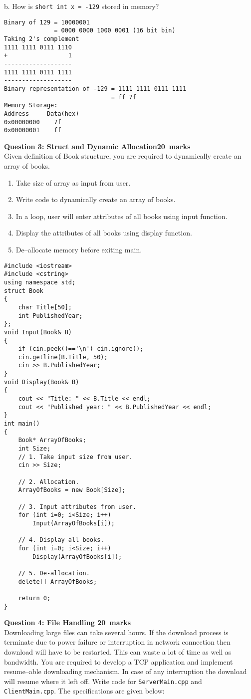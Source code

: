 \documentclass[12pt,a4paper]{article}
\def\Qthree{20}
\def\Qfour{20}
\begin{document}
b. How is \verb|short int x = -129| stored in memory?
\begin{verbatim}
Binary of 129 = 10000001
              = 0000 0000 1000 0001 (16 bit bin)
Taking 2's complement
1111 1111 0111 1110
+                 1
-------------------
1111 1111 0111 1111
-------------------
Binary representation of -129 = 1111 1111 0111 1111
                              = ff 7f
Memory Storage:
Address     Data(hex)
0x00000000    7f
0x00000001    ff
\end{verbatim}
\newpage
\noindent\textbf{Question 3: Struct and Dynamic Allocation\hfill \Qthree~marks}\\
Given definition of Book structure, you are required to dynamically create an array of books.
\begin{enumerate}
\item Take size of array as input from user.
\item Write code to dynamically create an array of books.
\item In a loop, user will enter attributes of all books using input function.
\item Display the attributes of all books using display function.
\item De--allocate memory before exiting main.
\end{enumerate}
\begin{lstlisting}
#include <iostream>
#include <cstring>
using namespace std;
struct Book
{
	char Title[50];
	int PublishedYear;
};
void Input(Book& B)
{
	if (cin.peek()=='\n') cin.ignore();
	cin.getline(B.Title, 50);
	cin >> B.PublishedYear;
}
void Display(Book& B)
{
	cout << "Title: " << B.Title << endl;
	cout << "Published year: " << B.PublishedYear << endl;
}
int main()
{
	Book* ArrayOfBooks;
	int Size;
	// 1. Take input size from user.
	cin >> Size;

	// 2. Allocation.
	ArrayOfBooks = new Book[Size];

	// 3. Input attributes from user.
	for (int i=0; i<Size; i++)
		Input(ArrayOfBooks[i]);

	// 4. Display all books.
	for (int i=0; i<Size; i++)
		Display(ArrayOfBooks[i]);

	// 5. De-allocation.
	delete[] ArrayOfBooks;

	return 0;
}
\end{lstlisting}
\newpage
\noindent\textbf{Question 4: File Handling \hfill \Qfour~marks}\\
Downloading large files can take several hours. If the download process is terminate due to power failure or interruption in network connection then download will have to be restarted. This can waste a lot of time as well as bandwidth. You are required to develop a TCP application and implement resume--able downloading mechanism. In case of any interruption the download will resume where it left off.  Write code for \verb|ServerMain.cpp| and \verb|ClientMain.cpp|. The specifications are given below:
\end{document}
